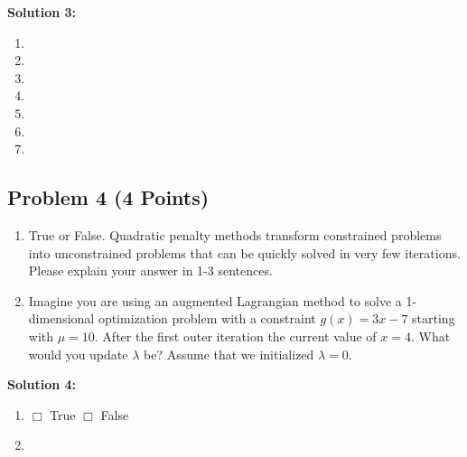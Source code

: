 \documentclass[]{article}
\begin{document}
\clearpage
\textbf{Solution 3:}
\begin{enumerate}[label=(\alph*)]
    \item %
    
    \item %
    
    \item %
    
    \item %
    
    \item %
    
    \item %
    
    \item %
    
\end{enumerate}

\clearpage
\subsection*{Problem 4 (4 Points)}
\begin{enumerate}[label=(\alph*)]
    \item True or False. Quadratic penalty methods transform constrained problems into unconstrained problems that can be quickly solved in very few iterations. Please explain your answer in 1-3 sentences.
    \item Imagine you are using an augmented Lagrangian method to solve a 1-dimensional optimization problem with a constraint $g(x) = 3x - 7$ starting with $\mu = 10$. After the first outer iteration the current value of $x = 4$. What would you update $\lambda$ be? Assume that we initialized $\lambda = 0$.
    
\end{enumerate}

\textbf{Solution 4:}
\begin{enumerate}[label=(\alph*)]
    \item $\Box$ True \quad \quad $\Box$ False \\
          
    \item %
          
\end{enumerate}
\end{document}

